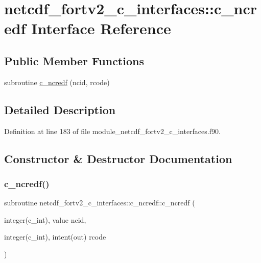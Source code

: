 \hypertarget{interfacenetcdf__fortv2__c__interfaces_1_1c__ncredf}{}\section{netcdf\+\_\+fortv2\+\_\+c\+\_\+interfaces\+:\+:c\+\_\+ncredf Interface Reference}
\label{interfacenetcdf__fortv2__c__interfaces_1_1c__ncredf}
\subsection*{Public Member Functions}
\begin{DoxyCompactItemize}
\item 
subroutine \hyperlink{interfacenetcdf__fortv2__c__interfaces_1_1c__ncredf_a65d89f6209f11c9387122ed0a1899874}{c\+\_\+ncredf} (ncid, rcode)
\end{DoxyCompactItemize}


\subsection{Detailed Description}


Definition at line 183 of file module\+\_\+netcdf\+\_\+fortv2\+\_\+c\+\_\+interfaces.\+f90.



\subsection{Constructor \& Destructor Documentation}
\mbox{\label{interfacenetcdf__fortv2__c__interfaces_1_1c__ncredf_a65d89f6209f11c9387122ed0a1899874}} 
\subsubsection{\texorpdfstring{c\+\_\+ncredf()}{c\_ncredf()}}
{\footnotesize\ttfamily subroutine netcdf\+\_\+fortv2\+\_\+c\+\_\+interfaces\+::c\+\_\+ncredf\+::c\+\_\+ncredf (\begin{DoxyParamCaption}\item[{integer(c\+\_\+int), value}]{ncid,  }\item[{integer(c\+\_\+int), intent(out)}]{rcode }\end{DoxyParamCaption})}



